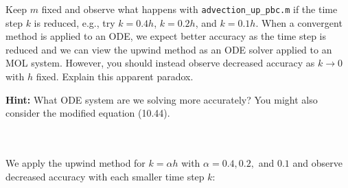 Keep $m$ fixed and observe what happens with \texttt{advection\_up\_pbc.m} if the time step $k$ is reduced, e.g., try
$k = 0.4h$, $k = 0.2h$, and $k = 0.1h$. When a convergent method is applied to an ODE, we expect better accuracy as the
time step is reduced and we can view the upwind method as an ODE solver applied to an MOL system. However, you should
instead observe decreased accuracy as $k \to 0$ with $h$ fixed. Explain this apparent paradox.

\textbf{Hint:} What ODE system are we solving more accurately? You might also consider the modified equation (10.44).

\begin{solution}\ \\\\
    We apply the upwind method for $k = \alpha h$ with $\alpha = 0.4, 0.2,$ and $0.1$ and observe decreased accuracy
    with each smaller time step $k$: \ \\\\


\end{solution}

